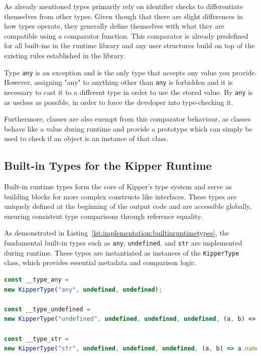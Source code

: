 As already mentioned types primarily rely on identifier checks to differentiate themselves from other types. Given though that there are slight differences in how types operate, they generally define themselves with what they are compatible using a comparator function. This comparator is already predefined for all built-ins in the runtime library and any user structures build on top of the existing rules established in the library.

Type \lstinline|any| is an exception and is the only type that accepts any value you provide. However, assigning "any" to anything other than \lstinline|any| is forbidden and it is necessary to cast it to a different type in order to use the stored value. By  \lstinline|any| is as useless as possible, in order to force the developer into type-checking it.

Furthermore, classes are also exempt from this comparator behaviour, as classes behave like a value during runtime and provide a prototype which can simply be used to check if an object is an instance of that class.

\subsection{Built-in Types for the Kipper Runtime}
\label{sec:builtintypes}

Built-in runtime types form the core of Kipper’s type system and serve as building blocks for more complex constructs like interfaces. These types are uniquely defined at the beginning of the output code and are accessible globally, ensuring consistent type comparisons through reference equality.

As demonstrated in Listing~\ref{lst:implementation:builtinruntimetypes}, the fundamental built-in types such as \lstinline|any|, \lstinline|undefined|, and \lstinline|str| are implemented during runtime. These types are instantiated as instances of the \lstinline|KipperType| class, which provides essential metadata and comparison logic.

\begin{lstlisting}[float,language=TypeScript,caption=Examples for the built-in runtime types,label=lst:implementation:builtinruntimetypes]
const __type_any =
new KipperType("any", undefined, undefined);

const __type_undefined =
new KipperType("undefined", undefined, undefined, undefined, (a, b) => a.name === b.name);

const __type_str =
new KipperType("str", undefined, undefined, undefined, (a, b) => a.name === b.name);
\end{lstlisting}

